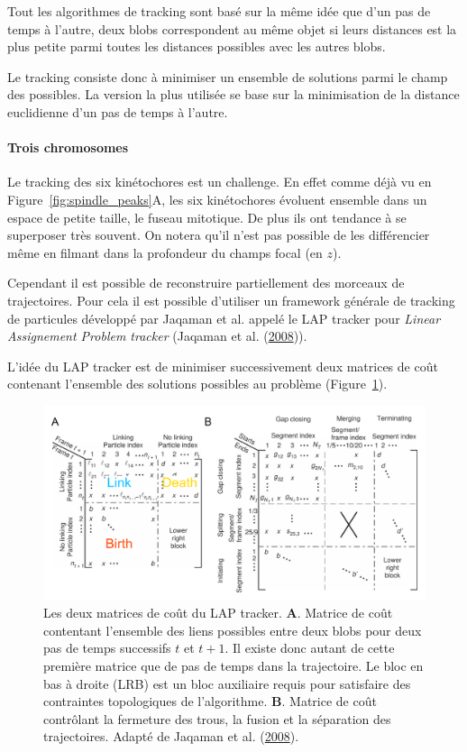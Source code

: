 \documentclass[12pt,a4paper,twoside,openright]{book}
\let\oldparagraph\paragraph
\renewcommand{\paragraph}[1]{\oldparagraph{#1}\mbox{}}
\begin{document}
Tout les algorithmes de tracking sont basé sur la même idée que d'un pas
de temps à l'autre, deux blobs correspondent au même objet si leurs
distances est la plus petite parmi toutes les distances possibles avec
les autres blobs.

Le tracking consiste donc à minimiser un ensemble de solutions parmi le
champ des possibles. La version la plus utilisée se base sur la
minimisation de la distance euclidienne d'un pas de temps à l'autre.

\paragraph{Trois chromosomes}\label{trois-chromosomes}

Le tracking des six kinétochores est un challenge. En effet comme déjà
vu en Figure~\ref{fig:spindle_peaks}A, les six kinétochores évoluent
ensemble dans un espace de petite taille, le fuseau mitotique. De plus
ils ont tendance à se superposer très souvent. On notera qu'il n'est pas
possible de les différencier même en filmant dans la profondeur du
champs focal (en \(z\)).

Cependant il est possible de reconstruire partiellement des morceaux de
trajectoires. Pour cela il est possible d'utiliser un framework générale
de tracking de particules développé par Jaqaman et al. appelé le LAP
tracker pour \emph{Linear Assignement Problem tracker} (Jaqaman et al.
(\hyperref[ref-Jaqaman2008]{2008})).

L'idée du LAP tracker est de minimiser successivement deux matrices de
coût contenant l'ensemble des solutions possibles au problème
(Figure~\ref{fig:jaqaman}).

\begin{figure}[htbp]
\centering
\includegraphics{figures/results/imaging/jaqaman.png}
\caption[Les deux matrices de coût du LAP tracker]{\label{fig:jaqaman}Les
deux matrices de coût du LAP tracker. \textbf{A}. Matrice de coût
contentant l'ensemble des liens possibles entre deux blobs pour deux pas
de temps successifs \(t\) et \(t+1\). Il existe donc autant de cette
première matrice que de pas de temps dans la trajectoire. Le bloc en bas
à droite (LRB) est un bloc auxiliaire requis pour satisfaire des
contraintes topologiques de l'algorithme. \textbf{B}. Matrice de coût
contrôlant la fermeture des trous, la fusion et la séparation des
trajectoires. Adapté de Jaqaman et al.
(\hyperref[ref-Jaqaman2008]{2008}).}
\end{figure}
\end{document}

